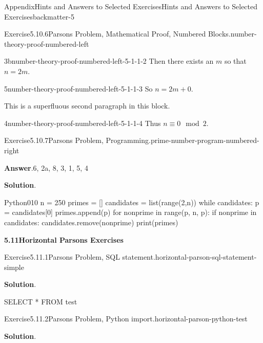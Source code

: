 \documentclass[oneside,10pt,]{book}
\newcommand{\blocktitlefont}{\relax}
\numberwithin{equation}{section}
\begin{document}
\begin{solutions-chapter}{Appendix}{Hints and Answers to Selected Exercises}{}{Hints and Answers to Selected Exercises}{}{}{backmatter-5}
\begin{divisionsolution}{Exercise}{5.10.6}{Parsons Problem, Mathematical Proof, Numbered Blocks.}{number-theory-proof-numbered-left}
\begin{descriptionlist}
\begin{dlinarrow}{3b}{number-theory-proof-numbered-left-5-1-1-2}
Then there exists an \(m\) so that \(n = 2m\).%
\end{dlinarrow}%
\begin{dlinarrow}{5}{number-theory-proof-numbered-left-5-1-1-3}%
So \(n = 2m + 0\).%
\par
This is a superfluous second paragraph in this block.%
\end{dlinarrow}%
\begin{dlinarrow}{4}{number-theory-proof-numbered-left-5-1-1-4}%
Thus \(n\equiv 0\mod 2\).%
\end{dlinarrow}%
\end{descriptionlist}
%
\end{divisionsolution}%
\begin{divisionsolution}{Exercise}{5.10.7}{Parsons Problem, Programming.}{prime-number-program-numbered-right}%
\par\smallskip%
\noindent\textbf{\blocktitlefont Answer}.\hypertarget{prime-number-program-numbered-right-5-back}{}\quad{}6, 2a, 8, 3, 1, 5, 4%
\par\smallskip%
\noindent\textbf{\blocktitlefont Solution}.\hypertarget{prime-number-program-numbered-right-6-back}{}\quad{}\begin{program}{Python}{0}{1}{0}
n = 250
primes = []
candidates = list(range(2,n))
while candidates:
    p = candidates[0]
    primes.append(p)
    for nonprime in range(p, n, p):
        if nonprime in candidates:
            candidates.remove(nonprime)
print(primes)
\end{program}
\end{divisionsolution}%
\par\medskip
\noindent\textbf{\Large{}5.11\space\textperiodcentered\space{}Horizontal Parsons Exercises}
\begin{divisionsolution}{Exercise}{5.11.1}{Parsons Problem, SQL statement.}{horizontal-parson-sql-statement-simple}%
\par\smallskip%
\noindent\textbf{\blocktitlefont Solution}.\hypertarget{horizontal-parson-sql-statement-simple-3-back}{}\quad{}%
\begin{codedisplay}
SELECT * FROM test
\end{codedisplay}
%
\end{divisionsolution}%
\begin{divisionsolution}{Exercise}{5.11.2}{Parsons Problem, Python import.}{horizontal-parson-python-test}%
\par\smallskip%
\noindent\textbf{\blocktitlefont Solution}.\hypertarget{horizontal-parson-python-test-3-back}{}\quad{}%

\end{divisionsolution}
\end{solutions-chapter}
\end{document}
